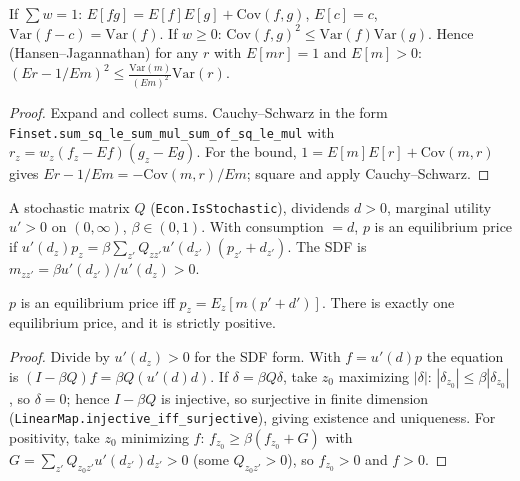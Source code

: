 \begin{lemma}
\label{lem:lt_moments}
\leanok
{}
If $\sum w = 1$: $E[fg] = E[f]E[g] + \mathrm{Cov}(f,g)$, $E[c] = c$, $\mathrm{Var}(f - c) = \mathrm{Var}(f)$. If $w \ge 0$:
$\mathrm{Cov}(f,g)^2 \le \mathrm{Var}(f)\mathrm{Var}(g)$. Hence (Hansen--Jagannathan) for any $r$ with $E[mr] = 1$ and
$E[m] > 0$: $(E r - 1/E m)^2 \le \frac{\mathrm{Var}(m)}{(Em)^2}\mathrm{Var}(r)$.
\end{lemma}
\begin{proof}
\leanok
Expand and collect sums. Cauchy--Schwarz in the form \texttt{Finset.sum\_sq\_le\_sum\_mul\_sum\_of\_sq\_le\_mul}
with $r_z = w_z(f_z - Ef)(g_z - Eg)$. For the bound, $1 = E[m]E[r] + \mathrm{Cov}(m,r)$ gives
$Er - 1/Em = -\mathrm{Cov}(m,r)/Em$; square and apply Cauchy--Schwarz.
\end{proof}

\begin{definition}
\label{def:lt_tree}
\leanok
{}
A stochastic matrix $Q$ (\texttt{Econ.IsStochastic}), dividends $d > 0$, marginal utility $u' > 0$ on $(0,\infty)$,
$\beta \in (0,1)$. With consumption $= d$, $p$ is an equilibrium price if
$u'(d_z)p_z = \beta\sum_{z'}Q_{zz'}u'(d_{z'})(p_{z'} + d_{z'})$. The SDF is $m_{zz'} = \beta u'(d_{z'})/u'(d_z) > 0$.
\end{definition}

\begin{theorem}
\label{thm:lt_price}
\leanok
{}
$p$ is an equilibrium price iff $p_z = E_z[m(p' + d')]$. There is exactly one equilibrium price, and it is
strictly positive.
\end{theorem}
\begin{proof}
\leanok
Divide by $u'(d_z) > 0$ for the SDF form. With $f = u'(d)p$ the equation is $(I - \beta Q)f = \beta Q(u'(d)d)$. If
$\delta = \beta Q\delta$, take $z_0$ maximizing $|\delta|$: $|\delta_{z_0}| \le \beta|\delta_{z_0}|$, so $\delta = 0$; hence
$I - \beta Q$ is injective, so surjective in finite dimension (\texttt{LinearMap.injective\_iff\_surjective}),
giving existence and uniqueness. For positivity, take $z_0$ minimizing $f$: $f_{z_0} \ge \beta(f_{z_0} + G)$ with
$G = \sum_{z'}Q_{z_0z'}u'(d_{z'})d_{z'} > 0$ (some $Q_{z_0z'} > 0$), so $f_{z_0} > 0$ and $f > 0$.
\end{proof}

